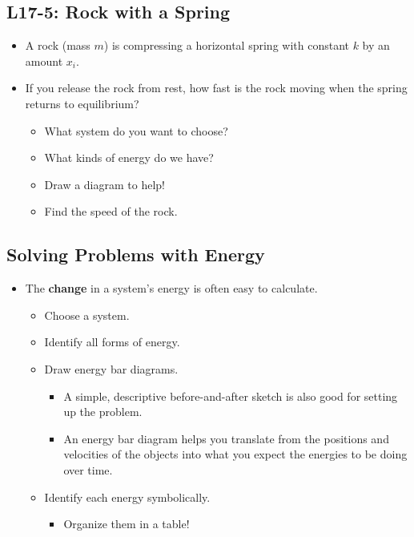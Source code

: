 \documentclass[]{article}
\newcommand{\Week}{17}
\begin{document}
\begin{PresentSpace}
\vspace{-10pt}
\section*{L\Week-5: Rock with a Spring}
\vspace{-10pt}
\begin{itemize}
	\item A rock (mass $m$) is compressing a horizontal spring with constant $k$ by an amount $x_{i}$.
	\item If you release the rock from rest, how fast is the rock moving when the spring returns to equilibrium?
	\begin{itemize}
		\item What system do you want to choose?
		\item What kinds of energy do we have?
		\item Draw a diagram to help!
		\item Find the speed of the rock.
	\end{itemize}
\end{itemize}
\end{PresentSpace}
\newpage
\begin{TeacherMargin}

\end{TeacherMargin}
\begin{PresentSpace}
\vspace{-10pt}
\section*{Solving Problems with Energy}
\vspace{-10pt}
\begin{itemize}
	\item The \textbf{change} in a system's energy is often easy to calculate.
	\begin{itemize}
		\item Choose a system.
		\item Identify all forms of energy.
		\item Draw energy bar diagrams.
		\begin{itemize}
			\item A simple, descriptive before-and-after sketch is also good for setting up the problem.
			\item An energy bar diagram helps you translate from the positions and velocities of the objects into what you expect the energies to be doing over time.
		\end{itemize}
		\item Identify each energy symbolically.
		\begin{itemize}
			\item Organize them in a table!
		\end{itemize}
	\end{itemize}
\end{itemize}
\end{PresentSpace}
\end{document}

